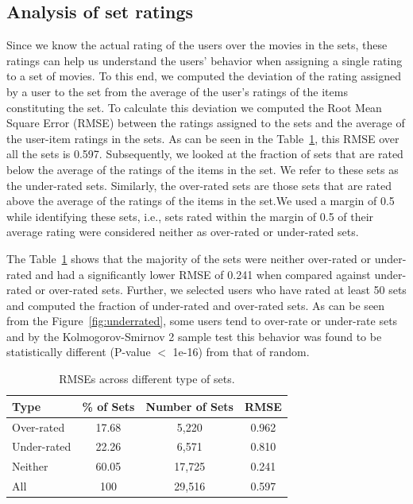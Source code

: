 \subsection{Analysis of set ratings}
Since we know the actual rating of the users over the movies in the sets,
these ratings can help us understand the users' behavior when assigning a single
rating to a set of movies. To this end, we computed the deviation of the 
rating assigned by a user to the set
from the average of the user's  ratings of the items constituting the set. To
calculate this deviation we computed the Root Mean Square Error (RMSE) between
the ratings assigned to the sets and the average of the user-item ratings in
the sets. As can be seen in the Table~\ref{table:sets_rmse_table}, this RMSE
over all the sets is 0.597. Subsequently, we looked at the fraction of sets that are
rated below the average of the ratings of the items in the set. We refer to
these sets as the under-rated sets. Similarly, the over-rated sets are
those sets that are rated above the average of the ratings of the items in the
set.We used a margin of 0.5 while identifying these sets, i.e., sets rated
within the margin of 0.5 of their average rating were considered neither as
over-rated or under-rated sets.

The Table~\ref{table:sets_rmse_table} shows that the majority of the sets were neither over-rated or
under-rated and had a significantly lower RMSE of 0.241 when compared against
under-rated or over-rated sets. Further, we selected users who have rated at
least 50 sets and computed the fraction of under-rated and over-rated sets.
As can be seen from the Figure~\ref{fig:underrated}, some users tend to over-rate or under-rate sets
and by the Kolmogorov-Smirnov 2 sample test this behavior was found to be
statistically different (P-value $<$ 1e-16) from that of random.

\begin{table}[t]
  \centering
  \caption{RMSEs across different type of sets.}
  \label{table:sets_rmse_table}
  \begin{tabular}{|l|c|c|c|}
    \hline
    Type
    &\multicolumn{1}{|p{2cm}|}{\centering \% of Sets}
    &\multicolumn{1}{|p{2cm}|}{\centering Number of Sets}
    &\multicolumn{1}{|p{1cm}|}{\centering RMSE} \\
    \hline
    Over-rated  & 17.68 & 5,220  & 0.962 \\
    Under-rated & 22.26 & 6,571  & 0.810 \\
        Neither & 60.05 & 17,725  & 0.241 \\
    \hline
    All & 100   & 29,516 & 0.597 \\
    \hline
  \end{tabular}
\end{table}


